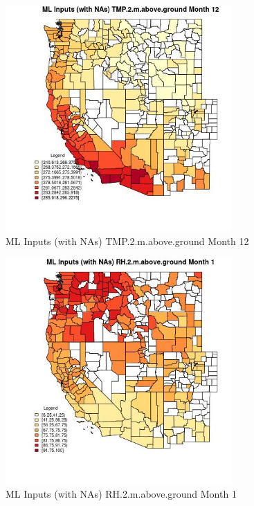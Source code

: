 \begin{figure} 
\centering  
\includegraphics[width=0.77\textwidth]{Code_Outputs/Report_ML_input_PM25_Step4_part_f_de_duplicated_aveswNAs_CountyTMP2mabovegroundmedianMonth12.jpg} 
\caption{\label{fig:Report_ML_input_PM25_Step4_part_f_de_duplicated_aveswNAsCountyTMP2mabovegroundmedianMonth12}ML Inputs (with NAs) TMP.2.m.above.ground Month 12} 
\end{figure} 
 

\begin{figure} 
\centering  
\includegraphics[width=0.77\textwidth]{Code_Outputs/Report_ML_input_PM25_Step4_part_f_de_duplicated_aveswNAs_CountyRH2mabovegroundmedianMonth1.jpg} 
\caption{\label{fig:Report_ML_input_PM25_Step4_part_f_de_duplicated_aveswNAsCountyRH2mabovegroundmedianMonth1}ML Inputs (with NAs) RH.2.m.above.ground Month 1} 
\end{figure} 
 


